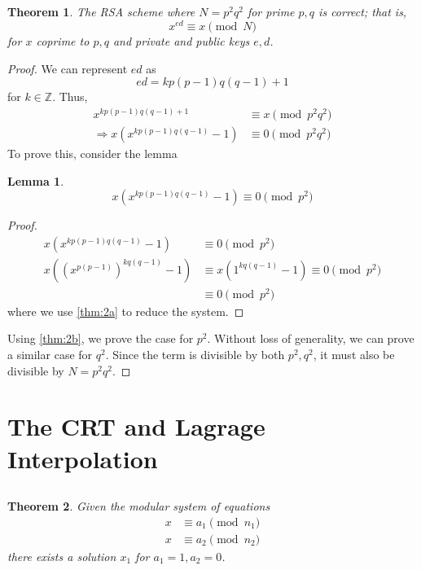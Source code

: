 \documentclass{article}
\newtheorem{theorem}{Theorem}
\newtheorem{lemma}{Lemma}
\newcommand{\Z}{\mathbb{Z}}
\begin{document}
\subsection{}

\begin{theorem}
    The RSA scheme where \(N = p^2 q^2\) for prime \(p, q\) is correct; that is,
    \begin{equation}
        x^{ed} \equiv x \pmod{N}
    \end{equation}
    for \(x\) coprime to \(p, q\) and private and public keys \(e, d\).
\end{theorem}
\begin{proof}
    We can represent \(ed\) as
    \begin{equation}
        ed = k p(p - 1) q(q - 1) + 1
    \end{equation}
    for \(k \in \Z\).
    Thus,
    \begin{align}
        x^{k p(p - 1) q(q - 1) + 1} &\equiv x \pmod{p^2 q^2} \\
        \Rightarrow x (x^{k p(p - 1) q(q - 1)} - 1) &\equiv 0 \pmod{p^2 q^2}
    \end{align}
    To prove this, consider the lemma
    \begin{lemma} \label{thm:2b}
        \begin{equation}
            x (x^{k p(p - 1) q(q - 1)} - 1) \equiv 0 \pmod{p^2}
        \end{equation}
    \end{lemma}
    \begin{proof}
        \begin{align}
            x (x^{k p(p - 1) q(q - 1)} - 1) &\equiv 0 \pmod{p^2} \\
            x \left((x^{p(p - 1)})^{k q(q - 1)} - 1\right) &\equiv x (1^{k q(q - 1)} - 1) \equiv 0 \pmod{p^2} \\
            &\equiv 0 \pmod{p^2}
        \end{align}
        where we use \autoref{thm:2a} to reduce the system.
    \end{proof}
    Using \autoref{thm:2b}, we prove the case for \(p^2\).
    Without loss of generality, we can prove a similar case for \(q^2\).
    Since the term is divisible by both \(p^2, q^2\), it must also be divisible by \(N = p^2 q^2\).
\end{proof}

\section{The CRT and Lagrage Interpolation}

\subsection{}

\begin{theorem}
    Given the modular system of equations
    \begin{align}
        x &\equiv a_1 \pmod{n_1} \\
        x &\equiv a_2 \pmod{n_2}
    \end{align}
    there exists a solution \(x_1\) for \(a_1 = 1, a_2 = 0\).
\end{theorem}
\end{document}
